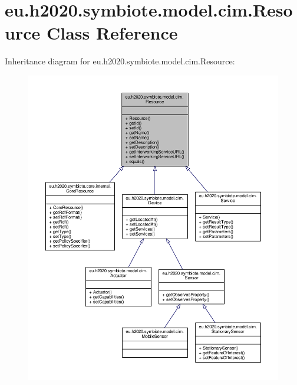 \hypertarget{classeu_1_1h2020_1_1symbiote_1_1model_1_1cim_1_1Resource}{}\section{eu.\+h2020.\+symbiote.\+model.\+cim.\+Resource Class Reference}
\label{classeu_1_1h2020_1_1symbiote_1_1model_1_1cim_1_1Resource}


Inheritance diagram for eu.\+h2020.\+symbiote.\+model.\+cim.\+Resource\+:\nopagebreak
\begin{figure}[H]
\begin{center}
\leavevmode
\includegraphics[width=350pt]{classeu_1_1h2020_1_1symbiote_1_1model_1_1cim_1_1Resource__inherit__graph}
\end{center}
\end{figure}


